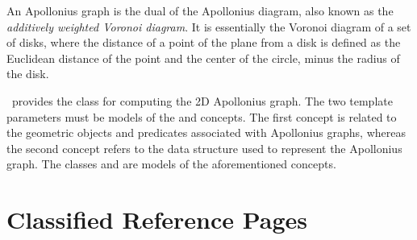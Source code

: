 
\label{ref-chapter-apollonius2}


An Apollonius graph is the dual of the Apollonius diagram, also known
as the {\em additively weighted Voronoi diagram}. It is essentially the
Voronoi diagram of a set of disks, where the distance of a
point of the plane from a disk is defined as the Euclidean
distance of the point and the center of the circle, minus the radius
of the disk.

\cgal\ provides the class  for
computing the 2D Apollonius graph. The two template parameters must be
models of the  and
 concepts. The first concept is
related to the geometric objects and predicates associated with
Apollonius graphs, whereas the second concept refers to the data
structure used to represent the Apollonius graph. The classes
 and
 are models of the
aforementioned concepts.


\section{Classified Reference Pages}

 \\
 \\
 \\
 \\


\\
\\
\\
\\
\\

